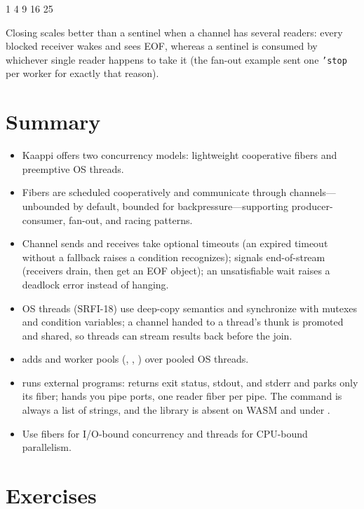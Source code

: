 \begin{codeoutput}
1 4 9 16 25
\end{codeoutput}

Closing scales better than a sentinel when a channel has several readers: every blocked receiver wakes and sees EOF, whereas a sentinel is consumed by whichever single reader happens to take it (the fan-out example sent one \texttt{'stop} per worker for exactly that reason).

\section*{Summary}

\begin{itemize}
    \item Kaappi offers two concurrency models: lightweight cooperative fibers and preemptive OS threads.
    \item Fibers are scheduled cooperatively and communicate through channels---unbounded by default, bounded for backpressure---supporting producer-consumer, fan-out, and racing patterns.
    \item Channel sends and receives take optional timeouts (an expired timeout without a fallback raises a condition  recognizes);  signals end-of-stream (receivers drain, then get an EOF object); an unsatisfiable wait raises a deadlock error instead of hanging.
    \item OS threads (SRFI-18) use deep-copy semantics and synchronize with mutexes and condition variables; a channel handed to a thread's thunk is promoted and shared, so threads can stream results back before the join.
    \item {} adds  and worker pools (, , ) over pooled OS threads.
    \item {} runs external programs:  returns exit status, stdout, and stderr and parks only its fiber;  hands you pipe ports, one reader fiber per pipe. The command is always a list of strings, and the library is absent on WASM and under .
    \item Use fibers for I/O-bound concurrency and threads for CPU-bound parallelism.
\end{itemize}

\section*{Exercises}

